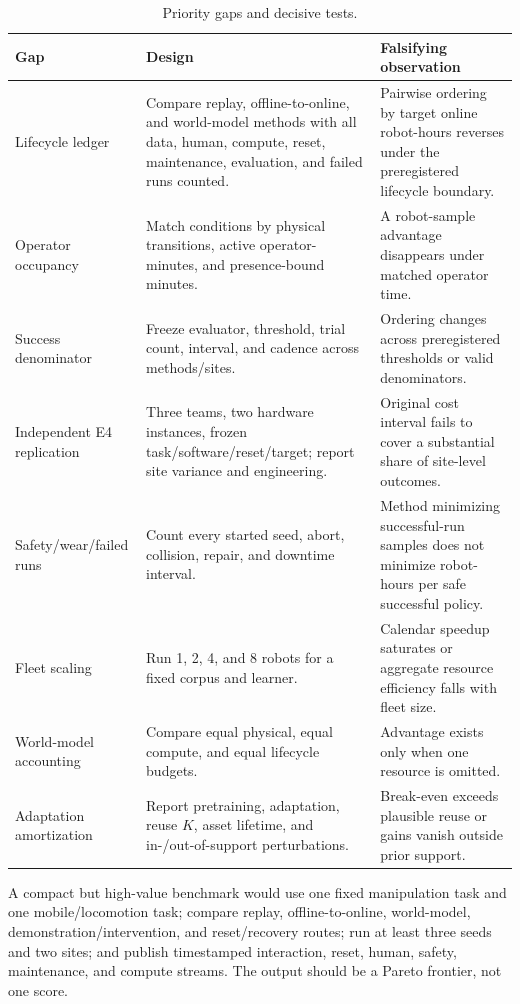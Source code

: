 \documentclass[11pt]{article}
\begin{document}
\begin{table}[t]
\centering
\small
\caption{Priority gaps and decisive tests.}
\label{tab:gaps}
\begin{tabularx}{\textwidth}{p{}p{}Y}
\toprule
Gap & Design & Falsifying observation \\
\midrule
Lifecycle ledger & Compare replay, offline-to-online, and world-model methods with all data, human, compute, reset, maintenance, evaluation, and failed runs counted. & Pairwise ordering by target online robot-hours reverses under the preregistered lifecycle boundary. \\
\addlinespace
Operator occupancy & Match conditions by physical transitions, active operator-minutes, and presence-bound minutes. & A robot-sample advantage disappears under matched operator time. \\
\addlinespace
Success denominator & Freeze evaluator, threshold, trial count, interval, and cadence across methods/sites. & Ordering changes across preregistered thresholds or valid denominators. \\
\addlinespace
Independent E4 replication & Three teams, two hardware instances, frozen task/software/reset/target; report site variance and engineering. & Original cost interval fails to cover a substantial share of site-level outcomes. \\
\addlinespace
Safety/wear/failed runs & Count every started seed, abort, collision, repair, and downtime interval. & Method minimizing successful-run samples does not minimize robot-hours per safe successful policy. \\
\addlinespace
Fleet scaling & Run 1, 2, 4, and 8 robots for a fixed corpus and learner. & Calendar speedup saturates or aggregate resource efficiency falls with fleet size. \\
\addlinespace
World-model accounting & Compare equal physical, equal compute, and equal lifecycle budgets. & Advantage exists only when one resource is omitted. \\
\addlinespace
Adaptation amortization & Report pretraining, adaptation, reuse $K$, asset lifetime, and in-/out-of-support perturbations. & Break-even exceeds plausible reuse or gains vanish outside prior support. \\
\bottomrule
\end{tabularx}
\end{table}

A compact but high-value benchmark would use one fixed manipulation task and one mobile/locomotion task; compare replay, offline-to-online, world-model, demonstration/intervention, and reset/recovery routes; run at least three seeds and two sites; and publish timestamped interaction, reset, human, safety, maintenance, and compute streams. The output should be a Pareto frontier, not one score.
\end{document}
